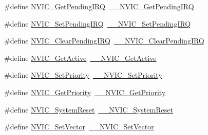 \begin{DoxyCompactItemize}
\item 
\#define \mbox{\hyperlink{group___c_m_s_i_s___core___n_v_i_c_functions_gac608957a239466e9e0cbc30aa64feb3b}{N\+V\+I\+C\+\_\+\+Get\+Pending\+I\+RQ}}~\mbox{\hyperlink{group___c_m_s_i_s___core___n_v_i_c_functions_ga5a92ca5fa801ad7adb92be7257ab9694}{\+\_\+\+\_\+\+N\+V\+I\+C\+\_\+\+Get\+Pending\+I\+RQ}}
\item 
\#define \mbox{\hyperlink{group___c_m_s_i_s___core___n_v_i_c_functions_ga2b47e2e52cf5c48a5c3348636434b3ac}{N\+V\+I\+C\+\_\+\+Set\+Pending\+I\+RQ}}~\mbox{\hyperlink{group___c_m_s_i_s___core___n_v_i_c_functions_gaabefdd4b790b9a7308929938c0c1e1ad}{\+\_\+\+\_\+\+N\+V\+I\+C\+\_\+\+Set\+Pending\+I\+RQ}}
\item 
\#define \mbox{\hyperlink{group___c_m_s_i_s___core___n_v_i_c_functions_ga590cf113000a079b1f0ea3dcd5b5316c}{N\+V\+I\+C\+\_\+\+Clear\+Pending\+I\+RQ}}~\mbox{\hyperlink{group___c_m_s_i_s___core___n_v_i_c_functions_ga562a86dbdf14827d0fee8fdafb04d191}{\+\_\+\+\_\+\+N\+V\+I\+C\+\_\+\+Clear\+Pending\+I\+RQ}}
\item 
\#define \mbox{\hyperlink{group___c_m_s_i_s___core___n_v_i_c_functions_ga58ad3f352f832235ab3b192ff4745320}{N\+V\+I\+C\+\_\+\+Get\+Active}}~\mbox{\hyperlink{group___c_m_s_i_s___core___n_v_i_c_functions_gaa2837003c28c45abf193fe5e8d27f593}{\+\_\+\+\_\+\+N\+V\+I\+C\+\_\+\+Get\+Active}}
\item 
\#define \mbox{\hyperlink{group___c_m_s_i_s___core___n_v_i_c_functions_gae0e9d0e2f7b6133828c71b57d4941c35}{N\+V\+I\+C\+\_\+\+Set\+Priority}}~\mbox{\hyperlink{group___c_m_s_i_s___core___n_v_i_c_functions_ga505338e23563a9c074910fb14e7d45fd}{\+\_\+\+\_\+\+N\+V\+I\+C\+\_\+\+Set\+Priority}}
\item 
\#define \mbox{\hyperlink{group___c_m_s_i_s___core___n_v_i_c_functions_gaf59b9d0a791d2157abb319753953eceb}{N\+V\+I\+C\+\_\+\+Get\+Priority}}~\mbox{\hyperlink{group___c_m_s_i_s___core___n_v_i_c_functions_gaeb9dc99c8e7700668813144261b0bc73}{\+\_\+\+\_\+\+N\+V\+I\+C\+\_\+\+Get\+Priority}}
\item 
\#define \mbox{\hyperlink{group___c_m_s_i_s___core___n_v_i_c_functions_ga6aa0367d3642575610476bf0366f0c48}{N\+V\+I\+C\+\_\+\+System\+Reset}}~\mbox{\hyperlink{group___c_m_s_i_s___core___n_v_i_c_functions_ga49f66a3782cbff3b821bd9802cd046f5}{\+\_\+\+\_\+\+N\+V\+I\+C\+\_\+\+System\+Reset}}
\item 
\#define \mbox{\hyperlink{group___c_m_s_i_s___core___n_v_i_c_functions_ga804af63bb4c4c317387897431814775d}{N\+V\+I\+C\+\_\+\+Set\+Vector}}~\mbox{\hyperlink{group___c_m_s_i_s___core___n_v_i_c_functions_ga0df355460bc1783d58f9d72ee4884208}{\+\_\+\+\_\+\+N\+V\+I\+C\+\_\+\+Set\+Vector}}

\end{DoxyCompactItemize}
